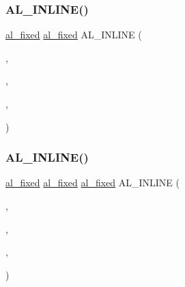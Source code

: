 \subsubsection{\texorpdfstring{A\+L\+\_\+\+I\+N\+L\+I\+N\+E()}{AL\_INLINE()}\hspace{0.1cm}{\footnotesize\ttfamily [4/7]}}
{\footnotesize\ttfamily \hyperlink{fixed_8h_acaad2e927f969d9882d1e1e80ac1c5e2}{al\+\_\+fixed} \hyperlink{fixed_8h_acaad2e927f969d9882d1e1e80ac1c5e2}{al\+\_\+fixed} A\+L\+\_\+\+I\+N\+L\+I\+NE (\begin{DoxyParamCaption}\item[{int}]{,  }\item[{al\+\_\+fixfloor}]{,  }\item[{(\hyperlink{fixed_8h_acaad2e927f969d9882d1e1e80ac1c5e2}{al\+\_\+fixed} \hyperlink{fmaths_8inl_a7ba8ab2f1e8f362163e17da3f15a5db9}{x})}]{,  }\item[{\{ \hyperlink{fmaths_8inl_a8ad2d7d1a24282db868a211942368bd1}{if}(\hyperlink{fmaths_8inl_a7ba8ab2f1e8f362163e17da3f15a5db9}{x} $>$=0) return(\hyperlink{fmaths_8inl_a7ba8ab2f1e8f362163e17da3f15a5db9}{x} $>$$>$ 16);\hyperlink{fmaths_8inl_a0544c3fe466e421738dae463968b70ba}{else} return $\sim$(($\sim$\hyperlink{fmaths_8inl_a7ba8ab2f1e8f362163e17da3f15a5db9}{x}) $>$$>$ 16);\}}]{ }\end{DoxyParamCaption})}

\mbox{\label{fmaths_8inl_a94e2a4e4da25547bca9cb2e53e4d4e8e}} 
\subsubsection{\texorpdfstring{A\+L\+\_\+\+I\+N\+L\+I\+N\+E()}{AL\_INLINE()}\hspace{0.1cm}{\footnotesize\ttfamily [5/7]}}
{\footnotesize\ttfamily \hyperlink{fixed_8h_acaad2e927f969d9882d1e1e80ac1c5e2}{al\+\_\+fixed} \hyperlink{fixed_8h_acaad2e927f969d9882d1e1e80ac1c5e2}{al\+\_\+fixed} \hyperlink{fixed_8h_acaad2e927f969d9882d1e1e80ac1c5e2}{al\+\_\+fixed} A\+L\+\_\+\+I\+N\+L\+I\+NE (\begin{DoxyParamCaption}\item[{\hyperlink{fixed_8h_acaad2e927f969d9882d1e1e80ac1c5e2}{al\+\_\+fixed}}]{,  }\item[{al\+\_\+itofix}]{,  }\item[{(int \hyperlink{fmaths_8inl_a7ba8ab2f1e8f362163e17da3f15a5db9}{x})}]{,  }\item[{\{ return \hyperlink{fmaths_8inl_a7ba8ab2f1e8f362163e17da3f15a5db9}{x}$<$$<$ 16;\}}]{ }\end{DoxyParamCaption})}

